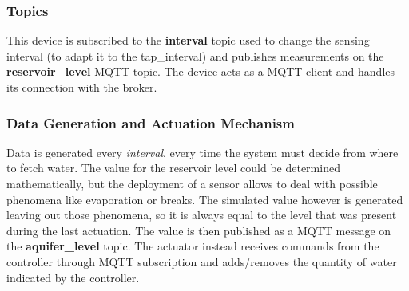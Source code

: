 \subsubsection{Topics}
This device is subscribed to the \textbf{interval} topic used to change the sensing interval (to adapt it to the tap\_interval) and publishes measurements on the \textbf{reservoir\_level} MQTT topic.
The device acts as a MQTT client and handles its connection with the broker.

\subsubsection{Data Generation and Actuation Mechanism}
Data is generated every \textit{interval}, every time the system must decide from where to fetch water. The value for the reservoir level could be determined mathematically, but the deployment of a sensor allows to deal with possible phenomena like evaporation or breaks. The simulated value however is generated leaving out those phenomena, so it is always equal to the level that was present during the last actuation. The value is then published as a MQTT message on the \textbf{aquifer\_level} topic. The actuator instead receives commands from the controller through MQTT subscription and adds/removes the quantity of water indicated by the controller. 

